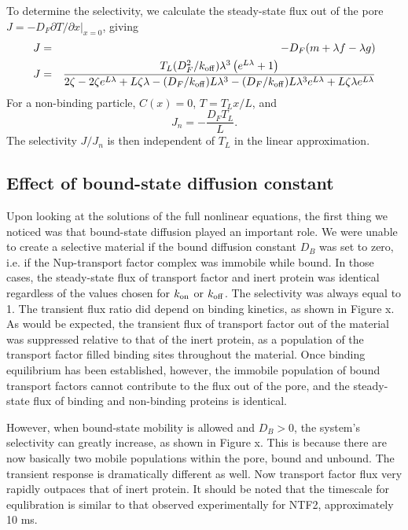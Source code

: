 To determine the selectivity, we calculate the steady-state flux out
of the pore\\ $ J =- D_F \partial T/\partial x|_{x=0}$, giving
\begin{eqnarray}
J& =&-D_F( m + \lambda f - \lambda g) \\
J&=& \frac{{T_L (D_F^2/k_{\rm off}) { \lambda}^3 \left(e^{L  \lambda}
     + 1\right)}}{2 \zeta - 2 \zeta e^{L  \lambda} + L \zeta
     \lambda - (D_F/k_{\rm off}) L  \lambda^3 - (D_F/k_{\rm off}) L  \lambda^3
     e^{L  \lambda} + L \zeta  \lambda e^{L  \lambda}} 
\end{eqnarray}
For a non-binding particle, $C(x) = 0$, $T = T_L x / L$, and
\begin{equation}
  J_n =-\frac{D_F T_L}{L}. 
\end{equation}
The selectivity $J/J_n$ is then independent of $T_L$ in
the linear approximation.

\subsection{Effect of bound-state diffusion constant}

Upon looking at the solutions of the full nonlinear equations, the first thing we noticed was that bound-state diffusion played an important role.  We were unable to create a selective material if the bound diffusion constant $D_B$ was set to zero, i.e. if the Nup-transport factor complex was immobile while bound.  In those cases, the steady-state flux of transport factor and inert protein was identical regardless of the values chosen for $k_{\rm on}$ or $k_{\rm off}$. The selectivity was always equal to 1.  The transient flux ratio did depend on binding kinetics, as shown in Figure x.  As would be expected, the transient flux of transport factor out of the material was suppressed relative to that of the inert protein, as a population of the transport factor filled binding sites throughout the material.  Once binding equilibrium has been established, however, the immobile population of bound transport factors cannot contribute to the flux out of the pore, and the steady-state flux of binding and non-binding proteins is identical.

However, when bound-state mobility is allowed and $D_B > 0$, the system's selectivity can greatly increase, as shown in Figure x.  This is because there are now basically two mobile populations within the pore, bound and unbound.  The transient response is dramatically different as well.  Now transport factor flux very rapidly outpaces that of inert protein.  It should be noted that the timescale for equlibration is similar to that observed experimentally for NTF2, approximately 10 ms.

